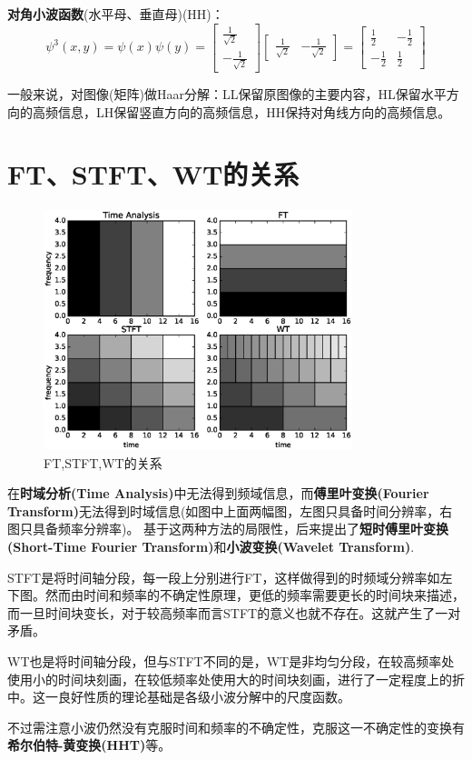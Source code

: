 \documentclass{article}
\begin{document}
\begin{CJK}{UTF8}{gbsn}
	\textbf{对角小波函数}(水平母、垂直母)(HH)：
	$$\psi^3(x,y)=\psi(x)\psi(y)=\begin{bmatrix}\frac{1}{\sqrt{2}}\\-\frac{1}{\sqrt{2}}\end{bmatrix}\begin{bmatrix}\frac{1}{\sqrt{2}}&-\frac{1}{\sqrt{2}}\end{bmatrix}=\begin{bmatrix}\frac{1}{2}&-\frac{1}{2}\\-\frac{1}{2}&\frac{1}{2}\end{bmatrix}$$\par
	一般来说，对图像(矩阵)做Haar分解：LL保留原图像的主要内容，HL保留水平方向的高频信息，LH保留竖直方向的高频信息，HH保持对角线方向的高频信息。\\

\section{FT、STFT、WT的关系}
\begin{figure}[H]
\centering
\includegraphics[height=7cm,width=9cm]{fig5.eps}
\caption{FT,STFT,WT的关系}
\label{5}
\end{figure}
	在\textbf{时域分析(Time Analysis)}中无法得到频域信息，而\textbf{傅里叶变换(Fourier Transform)}无法得到时域信息(如图中上面两幅图，左图只具备时间分辨率，右图只具备频率分辨率)。
	基于这两种方法的局限性，后来提出了\textbf{短时傅里叶变换(Short-Time Fourier Transform)}和\textbf{小波变换(Wavelet Transform)}.\par
	STFT是将时间轴分段，每一段上分别进行FT，这样做得到的时频域分辨率如左下图。然而由时间和频率的不确定性原理，更低的频率需要更长的时间块来描述，而一旦时间块变长，对于较高频率而言STFT的意义也就不存在。这就产生了一对矛盾。\par
	WT也是将时间轴分段，但与STFT不同的是，WT是非均匀分段，在较高频率处使用小的时间块刻画，在较低频率处使用大的时间块刻画，进行了一定程度上的折中。这一良好性质的理论基础是各级小波分解中的尺度函数。\par
	不过需注意小波仍然没有克服时间和频率的不确定性，克服这一不确定性的变换有\textbf{希尔伯特-黄变换(HHT)}等。\\



\end{CJK}
\end{document}
